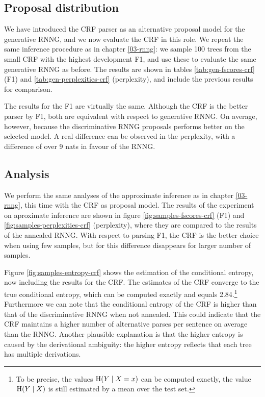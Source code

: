   \subsection{Proposal distribution}
    We have introduced the CRF parser as an alternative proposal model for the generative RNNG, and we now evaluate the CRF in this role. We repeat the same inference procedure as in chapter \ref{03-rnng}: we sample 100 trees from the small CRF with the highest development F1, and use these to evaluate the same generative RNNG as before. The results are shown in tables \ref{tab:gen-fscores-crf} (F1) and \ref{tab:gen-perplexities-crf} (perplexity), and include the previous results for comparison.

    

    

    The results for the F1 are virtually the same. Although the CRF is the better parser by F1, both are equivalent with respect to generative RNNG. On average, however, because the discriminative RNNG proposals performs better on the selected model. A real difference can be observed in the perplexity, with a difference of over 9 nats in favour of the RNNG.

  \subsection{Analysis}

    We perform the same analyses of the approximate inference as in chapter \ref{03-rnng}, this time with the CRF as proposal model. The results of the experiment on aproximate inference are shown in figure \ref{fig:samples-fscores-crf} (F1) and \ref{fig:samples-perplexities-crf} (perplexity), where they are compared to the results of the annealed RNNG. With respect to parsing F1, the CRF is the better choice when using few samples, but for this difference disappears for larger number of samples.

    Figure \ref{fig:samples-entropy-crf} shows the estimation of the conditional entropy, now including the results for the CRF. The estimates of the CRF converge to the true conditional entropy, which can be computed exactly and equals 2.84.\footnote{To be precise, the values $\operatorname{H}(Y \mid X = x)$ can be computed exactly, the value $\operatorname{H}(Y \mid X)$ is still estimated by a mean over the test set.} Furthermore we can note that the conditional entropy of the CRF is higher than that of the discriminative RNNG when not annealed. This could indicate that the CRF maintains a higher number of alternative parses per sentence on average than the RNNG. Another plausible explanation is that the higher entropy is caused by the derivational ambiguity: the higher entropy reflects that each tree has multiple derivations.

